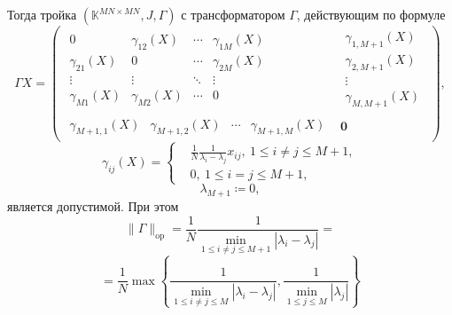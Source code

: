 \documentclass[12pt]{article}
\begin{document}
    Тогда тройка \( (\mathbb{K}^{{MN}{\times}{MN}}, J, \Gamma) \)
    с трансформатором \( \Gamma \), действующим по формуле
    \[
        \Gamma X =
        \left(\begin{array}{c|c}
            \begin{matrix}
                0               & \gamma_{12}(X) & \cdots & \gamma_{1M}(X) \\
                \gamma_{21}(X)  & 0              & \cdots & \gamma_{2M}(X) \\
                \vdots          & \vdots         & \ddots & \vdots & \ \\
                \gamma_{M1}(X)  & \gamma_{M2}(X) & \cdots & 0
            \end{matrix} &
            \begin{matrix}
                \gamma_{1,M+1}(X) \\
                \gamma_{2,M+1}(X) \\
                \vdots \\
                \gamma_{M,M+1}(X)
            \end{matrix} \\ \hline
            \begin{matrix}
                \gamma_{M{+}1,1}(X) &
                \gamma_{M{+}1,2}(X) &
                \cdots &
                \gamma_{M{+}1,M}(X)
            \end{matrix} &
            \mathbf{0}
        \end{array}\right),
        \]
    \[
        \gamma_{ij}(X) =
        \left\{\begin{aligned}
            & \frac1N \frac{1}{\lambda_i - \lambda_j} x_{ij},
              \ 1\leq i{\neq}j \leq M{+}1, \\
            & 0,
              \ 1\leq i{=}j \leq M{+}1,
        \end{aligned}\right.
        \]
    \[
        \lambda_{M+1} \coloneqq 0,
        \]
    является допустимой.
    При этом
    \[
        \|\Gamma\|_{\mathrm{op}} =
        \frac1N
        \frac{1}{\min_{1\leq i{\neq}j \leq M{+}1}|\lambda_i - \lambda_j|} =
        \]
    \[
        = \frac1N
         \max\left\{
         \frac{1}{
             \min\limits_{1\leq i{\neq}j \leq M }{|\lambda_i - \lambda_j|}},
         \frac{1}{
             \min\limits_{1\leq j \leq M}{|\lambda_j|}}
         \right\}
        \]
\endgroup
\end{document}
